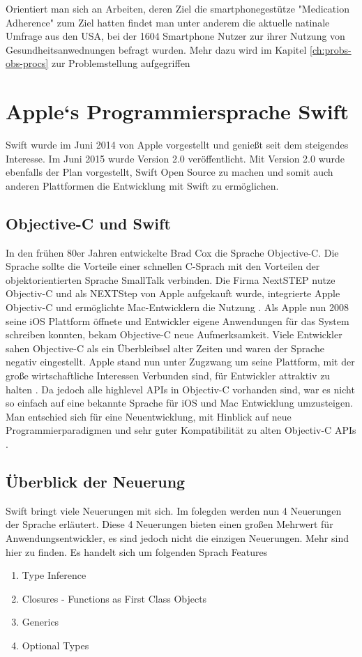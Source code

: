 Orientiert man sich an Arbeiten, deren Ziel die smartphonegestütze "Medication Adherence" zum Ziel hatten findet man unter anderem die aktuelle natinale Umfrage \cite{Krebs-P:2015aa} aus den USA, bei der 1604 Smartphone Nutzer zur ihrer Nutzung von Gesundheitsanwednungen befragt wurden. Mehr dazu wird im Kapitel \ref{ch:probs-obs-procs} zur Problemstellung  aufgegriffen
\section{Apple`s Programmiersprache Swift}
Swift wurde im Juni 2014 von Apple vorgestellt und genießt seit dem steigendes Interesse. Im Juni 2015 wurde Version 2.0 veröffentlicht. Mit Version 2.0 wurde ebenfalls der Plan vorgestellt, Swift Open Source zu machen und somit auch anderen Plattformen die Entwicklung mit Swift zu ermöglichen.

\subsection{Objective-C und Swift}
In den frühen 80er Jahren entwickelte Brad Cox die Sprache Objective-C. Die Sprache sollte die Vorteile einer schnellen C-Sprach mit den Vorteilen der objektorientierten Sprache SmallTalk verbinden. Die Firma NextSTEP nutze Objectiv-C und als NEXTStep von Apple aufgekauft wurde, integrierte Apple Objectiv-C und ermöglichte Mac-Entwicklern die Nutzung \cite{Dalrymple:2009aa}. Als Apple nun 2008 seine iOS Plattform öffnete und Entwickler eigene Anwendungen für das System schreiben konnten, bekam Objective-C neue Aufmerksamkeit. Viele Entwickler sahen Objective-C als ein Überbleibsel alter Zeiten und waren der Sprache negativ eingestellt. Apple stand nun unter Zugzwang um seine Plattform, mit der große wirtschaftliche Interessen Verbunden sind, für Entwickler attraktiv zu halten \cite{tre}. Da jedoch alle highlevel APIs in Objectiv-C vorhanden sind, war es nicht so einfach auf eine bekannte Sprache für iOS und Mac Entwicklung umzusteigen. Man entschied sich für eine Neuentwicklung, mit Hinblick auf neue Programmierparadigmen und sehr guter Kompatibilität zu alten Objectiv-C APIs \cite{tre}.

\subsection{Überblick der Neuerung}
Swift bringt viele Neuerungen mit sich. Im folegden werden nun 4 Neuerungen der Sprache erläutert. Diese 4 Neuerungen bieten einen großen Mehrwert für Anwendungsentwickler, es sind jedoch nicht die einzigen Neuerungen. Mehr sind hier\cite{tre} zu finden. Es handelt sich um folgenden Sprach Features
\begin{enumerate}
\item Type Inference
\item Closures - Functions as First Class Objects
\item Generics
\item Optional Types
\end{enumerate}

